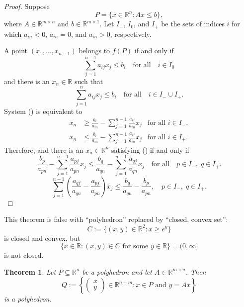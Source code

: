 \documentclass[12pt]{amsart}
\newtheorem{theorem}{Theorem}[section]
\theoremstyle{definition}
\theoremstyle{remark}
\numberwithin{equation}{section}
\newcommand{\RR}{\mathbb{R}}
\begin{document}
\begin{proof}
    Suppose
    \[
        P = \{x\in\RR^n : Ax\leq b\},
    \]
    where $A\in\RR^{m\times n}$ and $b\in\RR^{m\times 1}$.
    Let $I_-$, $I_0$, and $I_+$ be the sets of indices $i$ for
    which $a_{in} < 0$, $a_{in} = 0$, and $a_{in} > 0$, respectively.
    
    A point $(x_1,\ldots,x_{n-1})$ belongs to $f(P)$ if and only if
    \[
        \sum_{j=1}^{n-1}a_{ij}x_j \leq b_i
        \quad\text{for all}\quad i\in I_0\tag{\dag}
    \]
    and there is an $x_n\in\RR$ such that
    \[
        \sum_{j=1}^n a_{ij}x_j \leq b_i
        \quad\text{for all}\quad i\in I_-\cup I_+.\tag{\ddag}
    \]
    System (\ddag) is equivalent to
    \begin{align*}
        x_n &\geq \frac{b_i}{a_{in}}
        - \sum_{j=1}^{n-1}\frac{a_{ij}}{a_{in}}x_j
        &\text{for all $i\in I_-$},\\
        x_n &\leq \frac{b_i}{a_{in}}
        - \sum_{j=1}^{n-1}\frac{a_{ij}}{a_{in}}x_j
        &\text{for all $i\in I_+$}.
    \end{align*}
    Therefore, and there is an $x_n\in\RR^n$ satisfying (\ddag)
    if and only if
    \[
        \frac{b_p}{a_{pn}}
        - \sum_{j=1}^{n-1}\frac{a_{pj}}{a_{pn}}x_j
        \leq
        \frac{b_q}{a_{qn}}
        - \sum_{j=1}^{n-1}\frac{a_{qj}}{a_{qn}}x_j
        \quad\text{for all}\quad p\in I_-,\; q\in I_+.
    \]
    \[
        \sum_{j=1}^{n-1}\left(\frac{a_{qj}}{a_{qn}} - \frac{a_{pj}}{a_{pn}}\right)x_j
        \leq\frac{b_q}{a_{qn}}-\frac{b_p}{a_{pn}},
        \quad p\in I_-,\; q\in I_+.
    \]    
\end{proof}

This theorem is false with ``polyhedron'' replaced by ``closed, convex set'':
\[
    C := \{(x,y)\in\RR^2 : x\geq e^y\}
\]
is closed and convex, but
\[
    \{x\in\RR : \text{$(x,y)\in C$ for some $y\in\RR$}\} = (0,\infty]
\]
is not closed.


\begin{theorem}
    Let $P\subseteq\RR^n$ be a polyhedron and let $A\in\RR^{m\times n}$.
    Then
    \[
        Q:=\left\{\begin{pmatrix}x\\y\end{pmatrix}\in\RR^{n+m} :
        \text{$x\in P$ and $y=Ax$}\right\}
    \]
    is a polyhedron.
\end{theorem}
\end{document}

